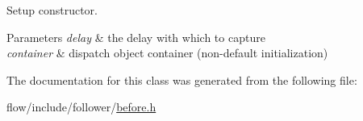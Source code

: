 Setup constructor. 


\begin{DoxyParams}{Parameters}
{\em delay} & the delay with which to capture \\
\hline
{\em container} & dispatch object container (non-\/default initialization) \\
\hline
\end{DoxyParams}


The documentation for this class was generated from the following file\+:\begin{DoxyCompactItemize}
\item 
flow/include/follower/\hyperlink{before_8h}{before.\+h}\end{DoxyCompactItemize}
